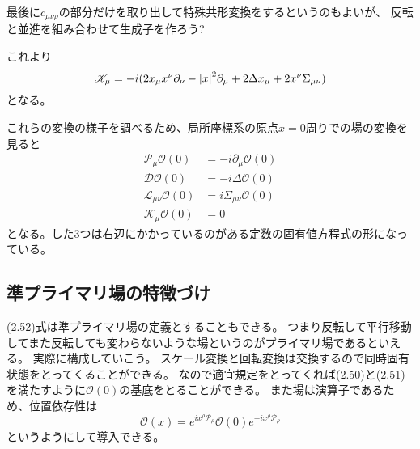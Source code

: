 \documentclass[../../master.tex]{subfiles}
\begin{document}
最後に\(c_{\mu\nu\rho}\)の部分だけを取り出して特殊共形変換をするというのもよいが、
反転と並進を組み合わせて生成子を作ろう? %

これより
\begin{equation}
    \mathscr{K}_\mu = -i(2x_\mu x^\nu \partial_\nu -\abs{x}^2 \partial_\mu + 2\Delta x_\mu +2 x^\nu \Sigma_{\mu\nu})
\end{equation}
となる。

これらの変換の様子を調べるため、局所座標系の原点\(x=0\)周りでの場の変換を見ると
\setcounter{equation}{48}
\begin{align}
    \mathscr{P}_\mu\mathcal{O}(0) &= -i\partial_\mu\mathcal{O}(0)\\
    \mathscr{D}\mathcal{O}(0) &= -i\Delta\mathcal{O}(0)\\
    \mathscr{L}_{\mu\nu}\mathcal{O}(0) &= i\Sigma_{\mu\nu}\mathcal{O}(0)\\
    \mathscr{K}_\mu\mathcal{O}(0) &= 0
\end{align}
となる。した3つは右辺にかかっているのがある定数の固有値方程式の形になっている。

\subsection*{準プライマリ場の特徴づけ}
(2.52)式は準プライマリ場の定義とすることもできる。
つまり反転して平行移動してまた反転しても変わらないような場というのがプライマリ場であるといえる。
実際に構成していこう。
スケール変換と回転変換は交換するので同時固有状態をとってくることができる。
なので適宜規定をとってくれば(2.50)と(2.51)を満たすように\(\mathcal{O}(0)\)の基底をとることができる。
また場は演算子であるため、位置依存性は
\begin{equation}
    \mathcal{O}(x) = e^{ix^\rho \mathscr{P}_\rho} \mathcal{O}(0) e^{-ix^\rho \mathscr{P}_\rho}
\end{equation}
というようにして導入できる。
\end{document}
